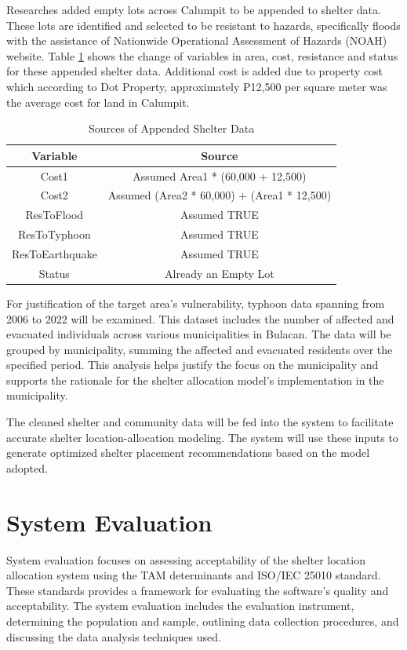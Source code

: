 	Researches added empty lots across Calumpit to be appended to shelter data. These lots are identified and selected to be resistant to hazards, specifically floods with the assistance of Nationwide Operational Assessment of Hazards (NOAH) website. Table \ref{AppendData} shows the change of variables in area, cost, resistance and status for these appended shelter data. Additional cost is added due to property cost which according to Dot Property, approximately ₱12,500 per square meter was the average cost for land in Calumpit.
	
	\begin{table}[h]
		\centering
		\caption{Sources of Appended Shelter Data}
		\label{AppendData}
			\begin{tabular}{|c|c|}
				\hline
				\multicolumn{1}{|c|}{\textbf{Variable}} & 
				\multicolumn{1}{c|}{\textbf{Source}} \\ \hline
				Cost1     & Assumed Area1 * (60,000 + 12,500) \\ \hline
				Cost2     & Assumed (Area2 * 60,000) + (Area1 * 12,500) \\ \hline
				ResToFlood     & Assumed TRUE \\ \hline
				ResToTyphoon    & Assumed TRUE \\ \hline
				ResToEarthquake     & Assumed TRUE \\ \hline
				Status     & Already an Empty Lot \\ \hline
				
			\end{tabular}
	\end{table}
	
	For justification of the target area’s vulnerability, typhoon data spanning from 2006 to 2022 will be examined. This dataset includes the number of affected and evacuated individuals across various municipalities in Bulacan. The data will be grouped by municipality, summing the affected and evacuated residents over the specified period. This analysis helps justify the focus on the municipality and supports the rationale for the shelter allocation model’s implementation in the municipality.
	
	The cleaned shelter and community data will be fed into the system to facilitate accurate shelter location-allocation modeling. The system will use these inputs to generate optimized shelter placement recommendations based on the model adopted.
	
	
\section{System Evaluation}
	System evaluation focuses on assessing acceptability of the shelter location allocation system using the TAM determinants and ISO/IEC 25010 standard. These standards provides a framework for evaluating the software's quality and acceptability. The system evaluation includes the evaluation instrument, determining the population and sample, outlining data collection procedures, and discussing the data analysis techniques used.

